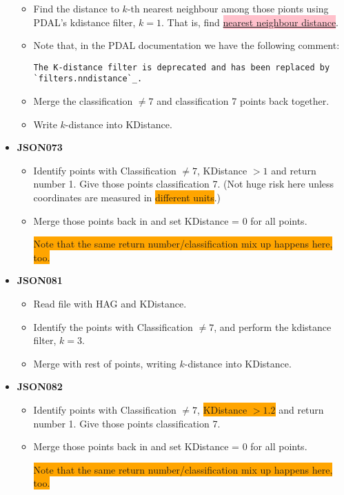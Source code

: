 \documentclass[a4paper,11pt,twoside]{article}
\theoremstyle{definition}
\theoremstyle{remark}
\newcommand{\sh}[1]{\colorbox{pink}{#1}}
\newcommand{\bad}[1]{\colorbox{orange}{#1}}
\begin{document}
\begin{itemize}
\begin{itemize}
\item Find the distance to $k$-th nearest neighbour among those pionts using PDAL's kdistance filter, $k=1$. That is, find \hyperref[nnd]{\sh{nearest neighbour distance}}.
\item Note that, in the PDAL documentation we have the following comment:
\begin{center}
\begin{verbatim}
The K-distance filter is deprecated and has been replaced by
`filters.nndistance`_.
\end{verbatim}
\end{center}
\item Merge the classification $\neq 7$ and classification 7 points back together.
\item Write $k$-distance into KDistance.
\end{itemize}
\item \textbf{JSON073}
\begin{itemize}
\item Identify points with Classification $\neq 7$, KDistance $>1$ and return number 1. Give those points classification 7. (Not huge risk here unless coordinates are measured in \bad{different units}.)
\item Merge those points back in and set KDistance = 0 for all points.
\begin{center}
\bad{Note that the same return number/classification mix up happens here, too.}
\end{center}
\end{itemize}
\item \textbf{JSON081}
\begin{itemize}
\item Read file with HAG and KDistance.
\item Identify the points with Classification $\neq 7$, and perform the kdistance filter, $k=3$.
\item Merge with rest of points, writing $k$-distance into KDistance.
\end{itemize}
\item \textbf{JSON082}
\begin{itemize}
\item Identify points with Classification $\neq 7$, \bad{KDistance $>1.2$} and return number 1. Give those points classification 7.
\item Merge those points back in and set KDistance = 0 for all points.
\begin{center}
\bad{Note that the same return number/classification mix up happens here, too.}

\end{center}
\end{itemize}
\end{itemize}
\end{document}
